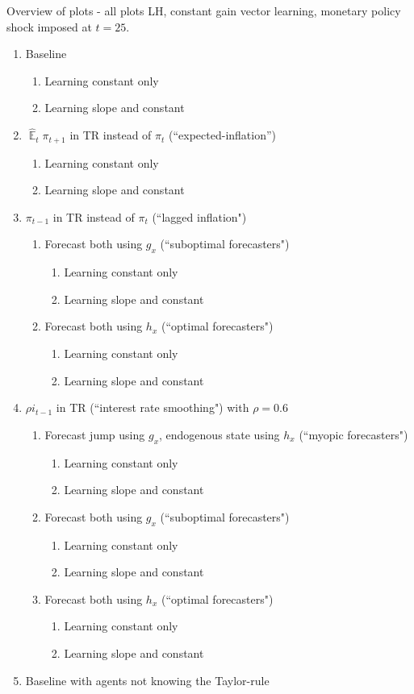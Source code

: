 \documentclass[11pt]{article}
\renewcommand{\[}{\begin{equation}}
\renewcommand{\]}{\end{equation}}
\DeclareMathOperator{\E}{\mathbb{E}}
\begin{document}
\newpage
\noindent Overview of plots - all plots LH, constant gain vector learning, monetary policy shock imposed at $t=25$.
\begin{enumerate}
\item Baseline
	\begin{enumerate}
	\item Learning constant only
	\item Learning slope and constant
	\end{enumerate}
\item $\hat{\E}_t\pi_{t+1}$ in TR instead of $\pi_t$ (``expected-inflation'')
	\begin{enumerate}
	\item Learning constant only
	\item Learning slope and constant
	\end{enumerate}
\item $\pi_{t-1}$ in TR instead of $\pi_t$ (``lagged inflation")
	\begin{enumerate}
	\item Forecast both using $g_x$ (``suboptimal forecasters")
		\begin{enumerate}
		\item Learning constant only
		\item Learning slope and constant
		\end{enumerate}
	\item Forecast both using $h_x$ (``optimal forecasters")
		\begin{enumerate}
		\item Learning constant only
		\item Learning slope and constant
		\end{enumerate}
	\end{enumerate}

\item $\rho i_{t-1}$ in TR (``interest rate smoothing") with $\rho=0.6$
\begin{enumerate}
\item Forecast jump using $g_x$, endogenous state using $h_x$ (``myopic forecasters")
\begin{enumerate}
\item Learning constant only
\item Learning slope and constant
\end{enumerate}
\item Forecast both using $g_x$ (``suboptimal forecasters")
\begin{enumerate}
\item Learning constant only
\item Learning slope and constant
\end{enumerate}
\item Forecast both using $h_x$ (``optimal forecasters")
\begin{enumerate}
\item Learning constant only
\item Learning slope and constant
\end{enumerate}
\end{enumerate}
\item Baseline with agents not knowing the Taylor-rule
\end{enumerate}
\newpage
\end{document}
